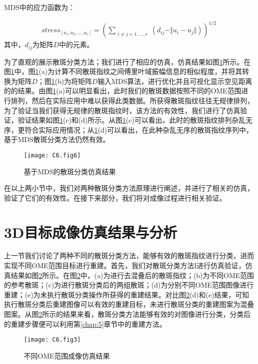 MDS中的应力函数为：

\begin{equation}
\begin{aligned}
stress_{[u_1,u_2,\ldots, u_r]} =\left( \sum_{\substack{i\neq j = 1,\ldots,r} } (d_{ij}-\Vert u_{i}- u_{j} \Vert ) \right)^{1/2}
\label{eq:6.6}
\end{aligned}
\end{equation}
其中，$d_{ij}$为矩阵$D$中的元素。

为了直观的展示散斑分类方法；我们进行了相应的仿真，仿真结果如图\ref{fig:6.6}所示。在图\ref{fig:6.6}中，图\ref{fig:6.6}(a)为计算不同散斑指纹之间傅里叶域振幅信息的相似程度，并将其转换为矩阵$D$；图\ref{fig:6.6}(b)为将矩阵$D$输入MDS算法，进行优化并且可视化显示空见距离的的结果。由图\ref{fig:6.6}(a)可以明显看出，此时我们的散斑数据按照不同的OME范围进行排列，然后在实际应用中难以获得此类数据。所获得散斑指纹往往无规律排列，为了验证当我们获得无规律的散斑指纹时，该方法的有效性，我们进行了仿真验证，验证结果如图\ref{fig:6.6}(c)和(d)所示。从图\ref{fig:6.6}(c)可以看出，此时的散斑指纹排列杂乱无序，更符合实际应用情况；从\ref{fig:6.6}(d)可以看出，在此种杂乱无序的散斑指纹序列中，基于MDS散斑分类方法仍然有效。
\begin{figure}[htp]
	\centering
	\texttt{[image: C6.fig6]}
	\caption{基于MDS的散斑分类仿真结果}
	\label{fig:6.6}
\end{figure}

在以上两小节中，我们对两种散斑分类方法原理进行阐述，并进行了相关的仿真，验证了它们的有效性。在接下来部分，我们将对成像过程进行相关验证。

\section{3D目标成像仿真结果与分析}

上一节我们讨论了两种不同的散斑分类方法，能够有效的散斑指纹进行分类，进而实现不同OME范围目标进行重建。首先，我们对散斑分类方法I进行仿真验证，仿真结果如图\ref{fig:6.3}所示。在图\ref{fig:6.3}中，(a)为进行去混叠后的散斑指纹；(b)为不同OME范围的参考散斑；(c)为进行散斑分类后的两组散斑；(d)为分别不同OME范围图像进行重建；(e)为未执行散斑分类操作所获得的重建结果。对比图\ref{fig:6.3}(d)和(e)结果，可知执行散斑分类后重建图像可以有效的重建目标，未进行散斑分类的重建图案为混叠图案。从图\ref{fig:6.3}所示的结果来看，散斑分类方法能够有效的对图像进行分类，分类后的重建步骤便可以利用第\ref{chap:5}章节中的重建方法。

\begin{figure}[htp]
	\centering
	\texttt{[image: C6.fig3]}
	\caption{不同OME范围成像仿真结果}
	\label{fig:6.3}
\end{figure}


